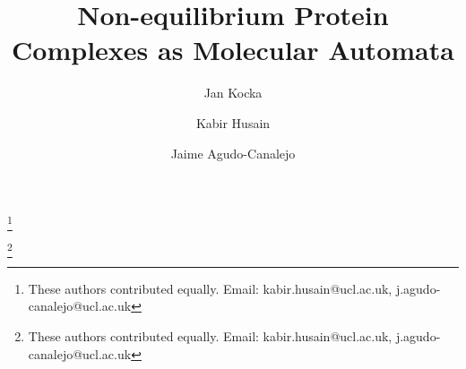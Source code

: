 \documentclass[aps, prx, letter, superscriptaddress, amsfonts, amssymb, amsmath, reprint, showkeys, nofootinbib, twoside, onecolumn]{revtex4-2}
\begin{document}
 
\title{Non-equilibrium Protein Complexes as Molecular Automata}
\author{Jan Kocka}
\address{Department of Physics and Astronomy, University College London, London WC1E 6BT, United Kingdom}
\author{Kabir Husain}
\thanks{These authors contributed equally. Email: kabir.husain@ucl.ac.uk, j.agudo-canalejo@ucl.ac.uk}
\address{Department of Physics and Astronomy, University College London, London WC1E 6BT, United Kingdom}
\address{Laboratory for Molecular Cell Biology, University College London, London WC1E 6BT, United Kingdom}
\author{Jaime Agudo-Canalejo}
\thanks{These authors contributed equally. Email: kabir.husain@ucl.ac.uk, j.agudo-canalejo@ucl.ac.uk}
\address{Department of Physics and Astronomy, University College London, London WC1E 6BT, United Kingdom}
\end{document}
